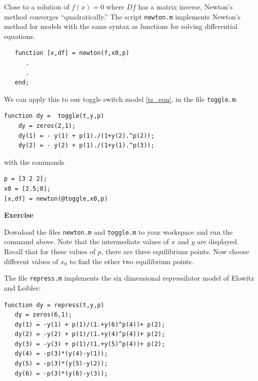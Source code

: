 \documentclass [11pt]{article}
\newcounter{exercise}
\numberwithin{exercise}{section}
\newcommand{\exnumber}{\addtocounter{exercise}{1} \theexercise \thinspace}
\begin{document}
Close to a solution of $f(x) = 0$ where $Df$ has a matrix inverse, Newton's method 
converges ``quadratically.'' The script \texttt{newton.m}
implements Newton's method for models with the same syntax as functions for
solving differential equations. 
\begin{verbatim}
   function [x,df] = newton(f,x0,p)
      .  
      .
   end; 
\end{verbatim}
%

We can apply this to our toggle switch model \eqref{ts_eqn}, in the file 
\texttt{toggle.m}: 
\begin{verbatim}
function dy =  toggle(t,y,p)
    dy = zeros(2,1);
    dy(1) = - y(1) + p(1)./(1+y(2).^p(2));
    dy(2) = - y(2) + p(1)./(1+y(1).^p(3));
\end{verbatim}
with the commands 
\begin{verbatim}
p = [3 2 2];
x0 = [2.5;0];
[x,df] = newton(@toggle,x0,p)
\end{verbatim}

{\bf Exercise \exnumber} Download the files \texttt{newton.m} and \texttt{toggle.m} to 
your workspace and run the command above. Note that the intermediate values of 
$x$ and $y$ are displayed. Recall that for these values of $p$, there are 
three equilibrium points. Now choose different values of $x_0$ to find the other 
two equilibrium points.

The file \texttt{repress.m} implements the six dimensional repressilator model of 
Elowitz and Leibler:
\begin{verbatim}
function dy = repress(t,y,p)
   dy = zeros(6,1);
   dy(1) = -y(1) + p(1)/(1.+y(6)^p(4))+ p(2);
   dy(2) = -y(2) + p(1)/(1.+y(4)^p(4))+ p(2);
   dy(3) = -y(3) + p(1)/(1.+y(5)^p(4))+ p(2);
   dy(4) = -p(3)*(y(4)-y(1));
   dy(5) = -p(3)*(y(5)-y(2));
   dy(6) = -p(3)*(y(6)-y(3));
\end{verbatim}
\end{document}
